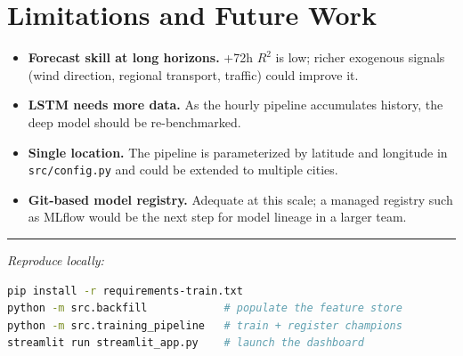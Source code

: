 \documentclass[11pt,a4paper]{article}
\newcommand{\rsq}{$R^2$}
\begin{document}
\section{Limitations and Future Work}
\begin{itemize}[leftmargin=1.4em]
  \item \textbf{Forecast skill at long horizons.} +72h \rsq{} is low; richer
        exogenous signals (wind direction, regional transport, traffic) could
        improve it.
  \item \textbf{LSTM needs more data.} As the hourly pipeline accumulates
        history, the deep model should be re-benchmarked.
  \item \textbf{Single location.} The pipeline is parameterized by latitude and
        longitude in \texttt{src/config.py} and could be extended to multiple
        cities.
  \item \textbf{Git-based model registry.} Adequate at this scale; a managed
        registry such as MLflow would be the next step for model lineage in a
        larger team.
\end{itemize}

\vspace{0.5cm}
\hrule
\vspace{0.3cm}
\noindent\small\textit{Reproduce locally:}
\begin{lstlisting}[language=bash]
pip install -r requirements-train.txt
python -m src.backfill            # populate the feature store
python -m src.training_pipeline   # train + register champions
streamlit run streamlit_app.py    # launch the dashboard
\end{lstlisting}
\end{document}
